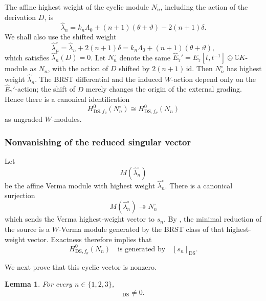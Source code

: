 \documentclass[11pt,reqno]{amsart}
\newtheorem{lemma}[theorem]{Lemma}
\theoremstyle{definition}
\theoremstyle{remark}
\begin{document}
The affine highest weight of the cyclic module \(N_n\), including the action
of the derivation \(D\), is
\begin{equation}
  \widehat\lambda_n
  =k_n\Lambda_0
   +(n+1)(\theta+\vartheta)
   -2(n+1)\delta.
  \label{e7:eq:E7-affine-highest-weight-lambda-n}
\end{equation}
We shall also use the shifted weight
\begin{equation*}
  \widehat\lambda_n^\circ
  =\widehat\lambda_n+2(n+1)\delta
  =k_n\Lambda_0+(n+1)(\theta+\vartheta),
\end{equation*}
which satisfies \(\widehat\lambda_n^\circ(D)=0\).  Let \(N_n^\circ\) denote the same
\(\widehat E_7'=E_7[t,t^{-1}]\oplus\mathbb CK\)-module as \(N_n\),
with the action of \(D\) shifted by \(2(n+1)\,\mathrm{id}\).  Then
\(N_n^\circ\) has highest weight \(\widehat\lambda_n^\circ\).
The BRST differential and the induced \(W\)-action depend only on the
\(\widehat E_7'\)-action; the shift of \(D\) merely changes the origin
of the external grading.  Hence there is a canonical identification
\begin{equation*}
  H^0_{\mathrm{DS},f_\theta}(N_n^\circ)
  \cong H^0_{\mathrm{DS},f_\theta}(N_n)
\end{equation*}
as ungraded \(W\)-modules.

\subsubsection{Nonvanishing of the reduced singular vector}


Let
\[
  M(\widehat\lambda_n^\circ)
\]
be the affine Verma module with highest weight
\(\widehat\lambda_n^\circ\).  There is a canonical surjection
\begin{equation*}
  M(\widehat\lambda_n^\circ)\twoheadrightarrow N_n^\circ
\end{equation*}
which sends the Verma highest-weight vector to \(s_n\).  By
\cite[Theorem~6.3]{KacWakimoto2004}, the minimal reduction of the source is a
\(W\)-Verma module generated by the BRST class of that highest-weight
vector.  Exactness therefore implies that
\begin{equation}
  H^0_{\mathrm{DS},f_\theta}(N_n)
  \quad\text{is generated by}\quad
  [s_n]_{\mathrm{DS}}.
  \label{e7:eq:E7-reduction-Nn-cyclic}
\end{equation}

We next prove that this cyclic vector is nonzero.

\begin{lemma}
\label{e7:lem:E7-reduced-singular-vector-nonzero}
For every \(n\in\{1,2,3\}\),
\begin{equation*}
  [s_n]_{\mathrm{DS}}\ne0.
\end{equation*}
\end{lemma}
\end{document}
